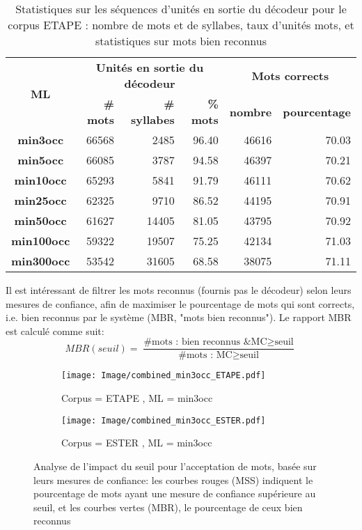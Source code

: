 \documentclass[10pt,a4paper,twoside]{article}
\begin{document}
\begin{table}[b!]
\begin{center}
\begin{tabular}{|c||r|r|r||r|r|}
\hline
\multirow{2}{*}{\bf ML}  & \multicolumn{3}{c||}{\bf Unités en sortie du décodeur} & \multicolumn{2}{c|}{\bf Mots corrects}  	\\ \cline{2-6}
 & {\bf \# mots} & {\bf \# syllabes} &  {\bf \% mots } & {\bf nombre} & {\bf pourcentage} 			\\ \hline\hline	
{\bf min3occ}     &  66568  &  2485   & 96.40  & 46616  & 70.03     		\\ \hline
{\bf min5occ}     &  66085  &  3787   & 94.58  & 46397  & 70.21    		\\ \hline
{\bf min10occ}   &  65293  &  5841   & 91.79  & 46111  & 70.62	 	\\ \hline
{\bf min25occ}   &  62325  &  9710   & 86.52  & 44195  & 70.91 		\\ \hline
{\bf min50occ}   &  61627  & 14405  & 81.05  & 43795  & 70.92 		\\ \hline
{\bf min100occ} &  59322  & 19507  & 75.25  & 42134  & 71.03   		\\ \hline
{\bf min300occ} &  53542  & 31605  & 68.58  & 38075  & 71.11 	  	\\ \hline
\end{tabular}
\caption{Statistiques sur les séquences d’unités en sortie du décodeur pour le corpus ETAPE : nombre de mots et de syllabes, taux d'unités mots, et statistiques sur mots bien reconnus} 
\label{Tab:RecWords}
\end{center}
\end{table}


Il est intéressant  de filtrer les mots reconnus (fournis pas le décodeur) selon leurs mesures de confiance, afin de maximiser le pourcentage de mots qui sont corrects, i.e. bien reconnus par le système (MBR, "mots bien reconnus"). Le rapport MBR est calculé comme suit: 
$$MBR(seuil)=\frac{\text{\# mots : bien reconnus \& MC} \ge \text{seuil}}{\text{\# mots : MC} \ge \text{seuil}}$$

\begin{figure*}[t!] 
\centering
        \begin{subfigure}[b]{0.45\textwidth}
		\texttt{[image: Image/combined\_min3occ\_ETAPE.pdf]}
               	\caption{Corpus = ETAPE , ML = min3occ}
        \end{subfigure}
	\hspace{0.3cm}
	\begin{subfigure}[b]{0.45\textwidth}
		\texttt{[image: Image/combined\_min3occ\_ESTER.pdf]}
                \caption{Corpus = ESTER , ML = min3occ}
        \end{subfigure}
\caption{Analyse de l'impact du seuil pour l'acceptation de mots, basée sur leurs mesures de confiance: les courbes rouges (MSS) indiquent le pourcentage de mots ayant une mesure de confiance supérieure au seuil, et les courbes vertes (MBR), le pourcentage de ceux bien reconnus}
\label{Fig:tc}
\end{figure*}
\end{document}
